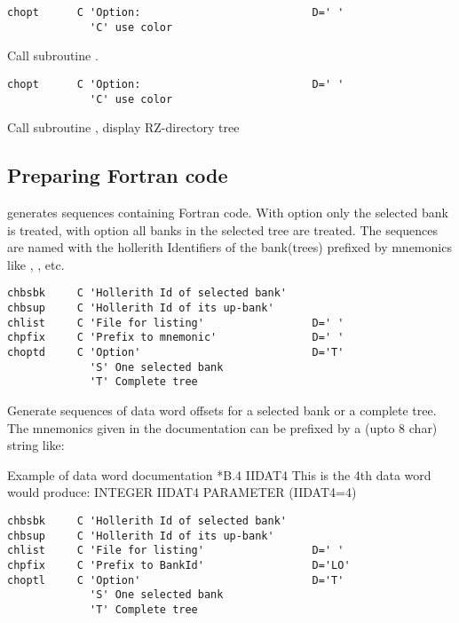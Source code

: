 \begin{verbatim}
chopt      C 'Option:                           D=' ' 
             'C' use color
\end{verbatim}
 
Call subroutine .
 
\begin{verbatim}
chopt      C 'Option:                           D=' ' 
             'C' use color
\end{verbatim}
 
Call subroutine , display RZ-directory tree
 
\subsection{Preparing Fortran code}
\label{sec:makecode}
\enlargethispage{\baselineskip}
 
 generates   sequences 
containing Fortran code.  
With option  only the selected bank is treated, 
with option  all banks in the selected tree are treated. 
The  sequences are named
with the hollerith Identifiers of the bank(trees) prefixed by mnemonics
like , ,  etc.
 
 
\begin{verbatim}
chbsbk     C 'Hollerith Id of selected bank'
chbsup     C 'Hollerith Id of its up-bank'
chlist     C 'File for listing'                 D=' '
chpfix     C 'Prefix to mnemonic'               D=' '
choptd     C 'Option'                           D='T'
             'S' One selected bank
             'T' Complete tree
\end{verbatim}
Generate sequences of data word offsets for a selected bank
or a complete tree. The mnemonics given in the documentation can be
prefixed by a (upto 8 char) string like: 
 
\begin{XMPt}{Example of data word documentation}
         *B.4 IIDAT4     This is the 4th data word
 {\rm would produce:}
         INTEGER IIDAT4
         PARAMETER (IIDAT4=4)
\end{XMPt}
 
 
\begin{verbatim}
chbsbk     C 'Hollerith Id of selected bank'
chbsup     C 'Hollerith Id of its up-bank'
chlist     C 'File for listing'                 D=' '
chpfix     C 'Prefix to BankId'                 D='LO'
choptl     C 'Option'                           D='T'
             'S' One selected bank
             'T' Complete tree
\end{verbatim}
 
